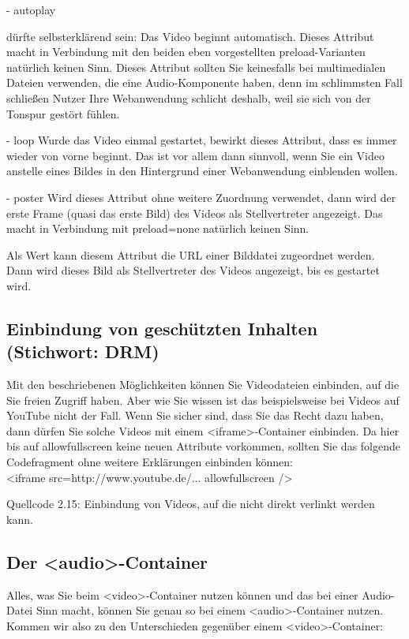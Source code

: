 -	autoplay

dürfte selbsterklärend sein: Das Video beginnt automatisch. Dieses Attribut macht in Verbindung mit den beiden eben vorgestellten preload-Varianten natürlich keinen Sinn. Dieses Attribut sollten Sie keinesfalls bei multimedialen Dateien verwenden, die eine Audio-Komponente haben, denn im schlimmsten Fall schließen Nutzer Ihre Webanwendung schlicht deshalb, weil sie sich von der Tonspur gestört fühlen.

-	loop
Wurde das Video einmal gestartet, bewirkt dieses Attribut, dass es immer wieder von vorne beginnt. Das ist vor allem dann sinnvoll, wenn Sie ein Video anstelle eines Bildes in den Hintergrund einer Webanwendung einblenden wollen. 

-	poster
Wird dieses Attribut ohne weitere Zuordnung verwendet, dann wird der erste Frame (quasi das erste Bild) des Videos als Stellvertreter angezeigt. Das macht in Verbindung mit preload=none natürlich keinen Sinn.

Als Wert kann diesem Attribut die URL einer Bilddatei zugeordnet werden. Dann wird dieses Bild als Stellvertreter des Videos angezeigt, bis es gestartet wird.

\subsection{Einbindung von geschützten Inhalten (Stichwort: DRM)}

Mit den beschriebenen Möglichkeiten können Sie Videodateien einbinden, auf die Sie freien Zugriff haben. Aber wie Sie wissen ist das beispielsweise bei Videos auf YouTube nicht der Fall. Wenn Sie sicher sind, dass Sie das Recht dazu haben, dann dürfen Sie solche Videos mit einem <iframe>-Container einbinden. Da hier bis auf allowfullscreen keine neuen Attribute vorkommen, sollten Sie das folgende Codefragment ohne weitere Erklärungen einbinden können:\\

<iframe src=http://www.youtube.de/...     allowfullscreen />

Quellcode 2.15: Einbindung von Videos, auf die nicht direkt verlinkt werden kann.

\subsection{Der <audio>-Container}

Alles, was Sie beim <video>-Container nutzen können und das bei einer Audio-Datei Sinn macht, können Sie genau so bei einem <audio>-Container nutzen. Kommen wir also zu den Unterschieden gegenüber einem <video>-Container:\\

